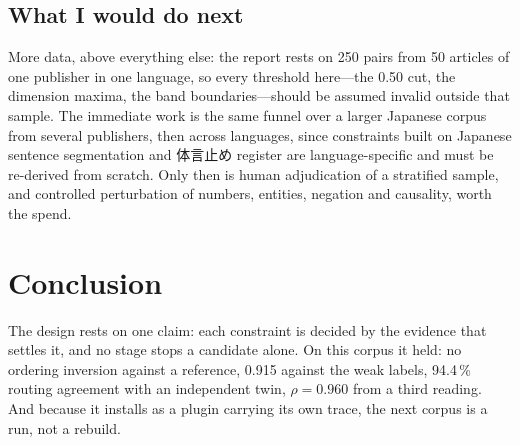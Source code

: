 \documentclass[conference]{IEEEtran}
\begin{document}
\subsection{What I would do next}
More data, above everything else: the report rests on 250 pairs from 50
articles of one publisher in one language, so every threshold here---the
0.50 cut, the dimension maxima, the band boundaries---should be assumed
invalid outside that sample. The immediate work is the same funnel
over a larger Japanese corpus from several publishers, then across
languages, since constraints built on Japanese sentence segmentation and
\mbox{体言止め} register are language-specific and must be re-derived from
scratch. Only then is human adjudication of a stratified sample, and
controlled perturbation of numbers, entities, negation and causality,
worth the spend.

\section{Conclusion}
The design rests on one claim: each constraint is decided by the evidence
that settles it, and no stage stops a candidate alone.
On this corpus it held: no ordering inversion against a reference, 0.915
against the weak labels, 94.4\,\% routing agreement with an independent twin,
$\rho = 0.960$ from a third reading. And because it installs as a plugin
carrying its own trace, the next corpus is a run, not a rebuild.

\balance
\end{document}
